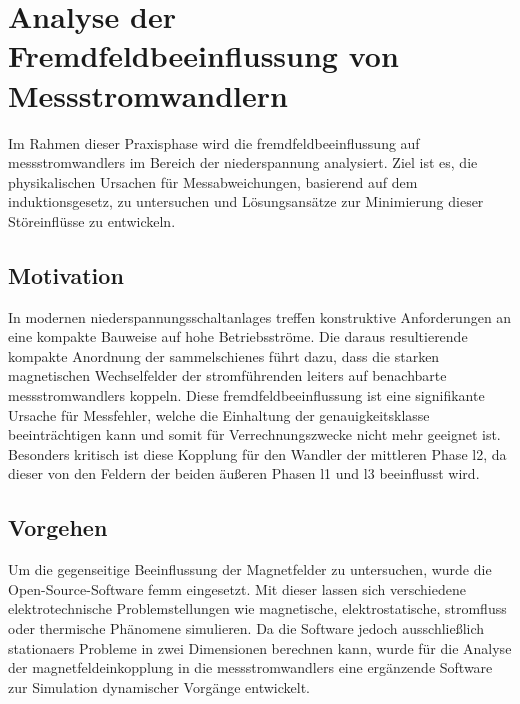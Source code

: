 
\section{Analyse der Fremdfeldbeeinflussung von Messstromwandlern}
\label{chap:projektbericht}

Im Rahmen dieser Praxisphase wird die \gls{fremdfeld}beeinflussung auf \glspl{messstromwandler} im Bereich der \gls{niederspannung} analysiert. Ziel ist es, die physikalischen Ursachen für Messabweichungen, basierend auf dem \gls{induktionsgesetz}, zu untersuchen und Lösungsansätze zur Minimierung dieser Störeinflüsse zu entwickeln.

\subsection{Motivation}
\label{sec:motivation}

In modernen \Glspl{niederspannungsschaltanlage} treffen konstruktive Anforderungen an eine kompakte Bauweise auf hohe Betriebsströme. Die daraus resultierende kompakte Anordnung der \glspl{sammelschiene} führt dazu, dass die starken magnetischen Wechselfelder der stromführenden \glspl{leiter} auf benachbarte \glspl{messstromwandler} koppeln. Diese \gls{fremdfeld}beeinflussung ist eine signifikante Ursache für Messfehler, welche die Einhaltung der \gls{genauigkeitsklasse} beeinträchtigen kann und somit für Verrechnungszwecke nicht mehr geeignet ist. Besonders kritisch ist diese Kopplung für den Wandler der mittleren Phase \acrshort{l2}, da dieser von den Feldern der beiden äußeren Phasen \acrshort{l1} und \acrshort{l3} beeinflusst wird.

\subsection{Vorgehen}
\label{sec:vorgehen}

Um die gegenseitige Beeinflussung der Magnetfelder zu untersuchen, wurde die Open-Source-Software \gls{femm} eingesetzt. Mit dieser lassen sich verschiedene elektrotechnische Problemstellungen wie magnetische, elektrostatische, stromfluss oder thermische Phänomene simulieren. Da die Software jedoch ausschließlich \glspl{stationaer} Probleme in zwei Dimensionen berechnen kann, wurde für die Analyse der \gls{magnetfeldeinkopplung} in die \glspl{messstromwandler} eine ergänzende Software zur Simulation dynamischer Vorgänge entwickelt.

